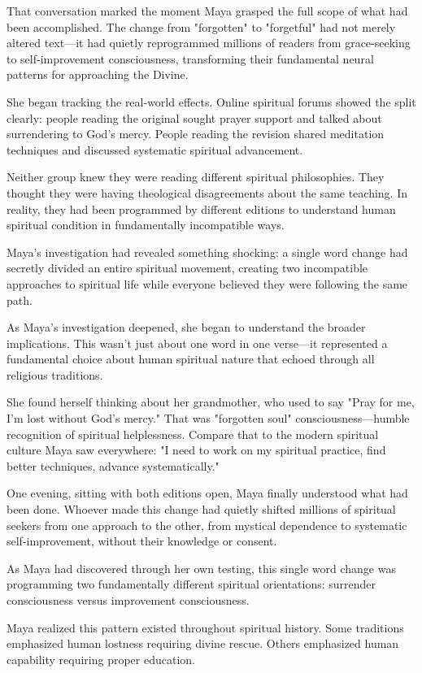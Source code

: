 \documentclass[11pt,twoside]{book}
\begin{document}
That conversation marked the moment Maya grasped the full scope of what had been accomplished. The change from "forgotten" to "forgetful" had not merely altered text—it had quietly reprogrammed millions of readers from grace-seeking to self-improvement consciousness, transforming their fundamental neural patterns for approaching the Divine.

She began tracking the real-world effects. Online spiritual forums showed the split clearly: people reading the original sought prayer support and talked about surrendering to God's mercy. People reading the revision shared meditation techniques and discussed systematic spiritual advancement.

Neither group knew they were reading different spiritual philosophies. They thought they were having theological disagreements about the same teaching. In reality, they had been programmed by different editions to understand human spiritual condition in fundamentally incompatible ways.

Maya's investigation had revealed something shocking: a single word change had secretly divided an entire spiritual movement, creating two incompatible approaches to spiritual life while everyone believed they were following the same path.

As Maya's investigation deepened, she began to understand the broader implications. This wasn't just about one word in one verse—it represented a fundamental choice about human spiritual nature that echoed through all religious traditions.

She found herself thinking about her grandmother, who used to say "Pray for me, I'm lost without God's mercy." That was "forgotten soul" consciousness—humble recognition of spiritual helplessness. Compare that to the modern spiritual culture Maya saw everywhere: "I need to work on my spiritual practice, find better techniques, advance systematically."

One evening, sitting with both editions open, Maya finally understood what had been done. Whoever made this change had quietly shifted millions of spiritual seekers from one approach to the other, from mystical dependence to systematic self-improvement, without their knowledge or consent.

As Maya had discovered through her own testing, this single word change was programming two fundamentally different spiritual orientations: surrender consciousness versus improvement consciousness.

Maya realized this pattern existed throughout spiritual history. Some traditions emphasized human lostness requiring divine rescue. Others emphasized human capability requiring proper education.
\end{document}
